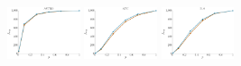 \documentclass[a4paper]{report}
\newcommand{\wratio}{0.16}
\begin{document}
\includegraphics[width=\wratio\textwidth]{influence/ASTRO/fs_astro}\hfill
\includegraphics[width=\wratio\textwidth]{influence/ATC/fs_atc}\hfill
\includegraphics[width=\wratio\textwidth]{influence/B_A/fs_b_a}\hfill
\end{document}
